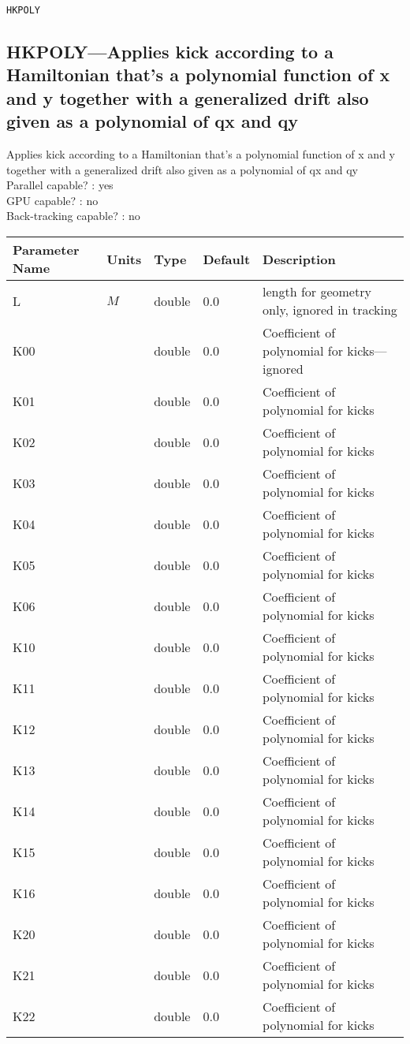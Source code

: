 \newpage
\begin{center}{\Large\verb|HKPOLY|}\end{center}
\subsection{HKPOLY---Applies kick according to a Hamiltonian that's a polynomial function of x and y together with a generalized drift also given as a polynomial of qx and qy}
Applies kick according to a Hamiltonian that's a polynomial function of x and y together with a generalized drift also given as a polynomial of qx and qy
\\
Parallel capable? : yes\\
GPU capable? : no\\
Back-tracking capable? : no\\
\begin{tabular}{|l|l|l|l|p{\descwidth}|} \hline
Parameter Name & Units & Type & Default & Description \\ \hline 
L & $M$ & double &  0.0 & length for geometry only, ignored in tracking  \\ \hline 
K00 &  & double &  0.0 & Coefficient of polynomial for kicks---ignored  \\ \hline 
K01 &  & double &  0.0 & Coefficient of polynomial for kicks  \\ \hline 
K02 &  & double &  0.0 & Coefficient of polynomial for kicks  \\ \hline 
K03 &  & double &  0.0 & Coefficient of polynomial for kicks  \\ \hline 
K04 &  & double &  0.0 & Coefficient of polynomial for kicks  \\ \hline 
K05 &  & double &  0.0 & Coefficient of polynomial for kicks  \\ \hline 
K06 &  & double &  0.0 & Coefficient of polynomial for kicks  \\ \hline 
K10 &  & double &  0.0 & Coefficient of polynomial for kicks  \\ \hline 
K11 &  & double &  0.0 & Coefficient of polynomial for kicks  \\ \hline 
K12 &  & double &  0.0 & Coefficient of polynomial for kicks  \\ \hline 
K13 &  & double &  0.0 & Coefficient of polynomial for kicks  \\ \hline 
K14 &  & double &  0.0 & Coefficient of polynomial for kicks  \\ \hline 
K15 &  & double &  0.0 & Coefficient of polynomial for kicks  \\ \hline 
K16 &  & double &  0.0 & Coefficient of polynomial for kicks  \\ \hline 
K20 &  & double &  0.0 & Coefficient of polynomial for kicks  \\ \hline 
K21 &  & double &  0.0 & Coefficient of polynomial for kicks  \\ \hline 
K22 &  & double &  0.0 & Coefficient of polynomial for kicks  \\ \hline 
\end{tabular}

